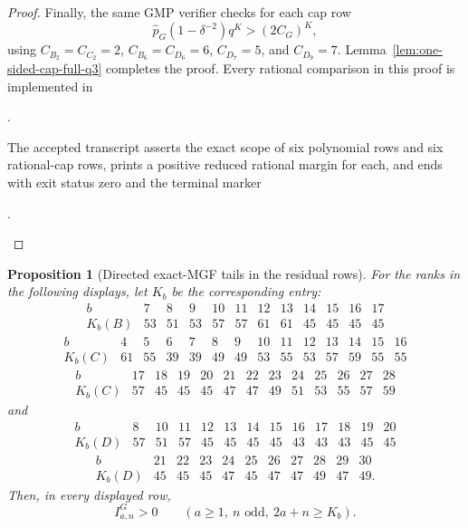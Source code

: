 \documentclass[11pt,reqno]{amsart}
\theoremstyle{plain}
\newtheorem{proposition}[theorem]{Proposition}
\theoremstyle{definition}
\begin{document}
\begin{proof}
Finally, the same GMP verifier checks for each cap row
\[
 \widehat p_G(1-\delta^{-2})q^K>(2C_G)^K,
\]
using $C_{B_2}=C_{C_2}=2$, $C_{B_6}=C_{D_6}=6$, $C_{D_7}=5$, and
$C_{D_9}=7$.  Lemma~\ref{lem:one-sided-cap-full-q3} completes the proof.
Every rational comparison in this proof is implemented in
\begin{center}
.
\end{center}
The accepted transcript
 asserts the exact
scope of six polynomial rows and six rational-cap rows, prints a positive
reduced rational margin for each, and ends with exit status zero and the
terminal marker
\begin{center}
\small{}.
\end{center}
\end{proof}

\begin{proposition}[Directed exact-MGF tails in the residual rows]
\label{prop:bcd-remaining-directed-tails}
For the ranks in the following displays, let $K_b$ be the corresponding
entry:
\[
\begin{array}{c|rrrrrrrrrrr}
b&7&8&9&10&11&12&13&14&15&16&17\\ \hline
K_b(B)&53&51&53&57&57&61&61&45&45&45&45
\end{array}
\]
\[
\begin{array}{c|rrrrrrrrrrrrr}
b&4&5&6&7&8&9&10&11&12&13&14&15&16\\ \hline
K_b(C)&61&55&39&39&49&49&53&55&53&57&59&55&55
\end{array}
\]
\[
\begin{array}{c|rrrrrrrrrrrr}
b&17&18&19&20&21&22&23&24&25&26&27&28\\ \hline
K_b(C)&57&45&45&45&47&47&49&51&53&55&57&59
\end{array}
\]
and
\[
\begin{array}{c|rrrrrrrrrrrr}
b&8&10&11&12&13&14&15&16&17&18&19&20\\ \hline
K_b(D)&57&51&57&45&45&45&45&43&43&43&45&45
\end{array}
\]
\[
\begin{array}{c|rrrrrrrrrr}
b&21&22&23&24&25&26&27&28&29&30\\ \hline
K_b(D)&45&45&45&47&45&47&47&49&47&49.
\end{array}
\]
Then, in every displayed row,
\[
 I^G_{a,n}>0
 \qquad(a\geq1,\ n\text{ odd},\ 2a+n\geq K_b).
\]
\end{proposition}
\end{document}
